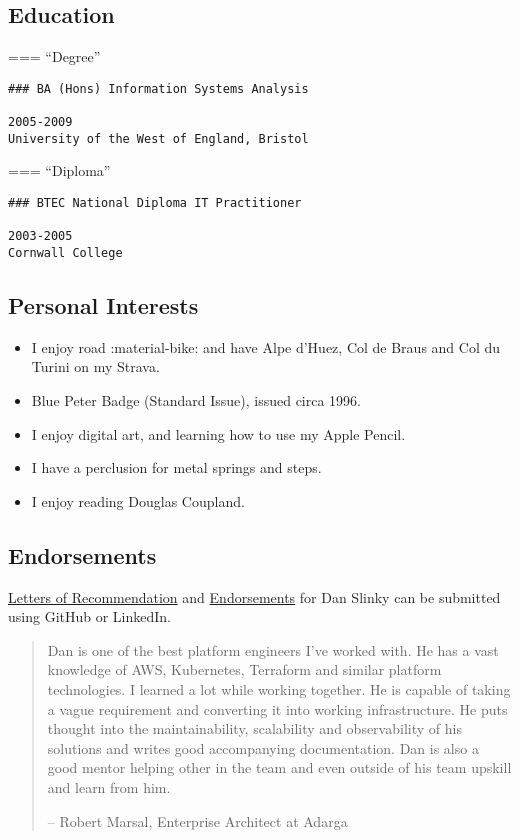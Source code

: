 \documentclass[
]{article}
\providecommand{\tightlist}{%
  \setlength{\itemsep}{0pt}\setlength{\parskip}{0pt}}
\begin{document}
\hypertarget{education}{%
\subsection{Education}\label{education}}

=== ``Degree''

\begin{verbatim}
### BA (Hons) Information Systems Analysis

2005-2009
University of the West of England, Bristol
\end{verbatim}

=== ``Diploma''

\begin{verbatim}
### BTEC National Diploma IT Practitioner

2003-2005
Cornwall College
\end{verbatim}

\hypertarget{personal-interests}{%
\subsection{Personal Interests}\label{personal-interests}}

\begin{itemize}
\tightlist
\item
  I enjoy road :material-bike: and have Alpe d'Huez, Col de Braus and
  Col du Turini on my Strava.
\item
  Blue Peter Badge (Standard Issue), issued circa 1996.
\item
  I enjoy digital art, and learning how to use my Apple Pencil.
\item
  I have a perclusion for metal springs and steps.
\item
  I enjoy reading Douglas Coupland.
\end{itemize}

\hypertarget{endorsements}{%
\subsection{Endorsements}\label{endorsements}}

\href{https://github.com/danslinky/danslinky.co.uk/issues/new/choose}{Letters
of Recommendation} and
\href{https://linkedin.com/in/danslinky}{Endorsements} for Dan Slinky
can be submitted using GitHub or LinkedIn.

\begin{quote}
Dan is one of the best platform engineers I've worked with. He has a
vast knowledge of AWS, Kubernetes, Terraform and similar platform
technologies. I learned a lot while working together. He is capable of
taking a vague requirement and converting it into working
infrastructure. He puts thought into the maintainability, scalability
and observability of his solutions and writes good accompanying
documentation. Dan is also a good mentor helping other in the team and
even outside of his team upskill and learn from him.

-- Robert Marsal, Enterprise Architect at Adarga
\end{quote}
\end{document}
